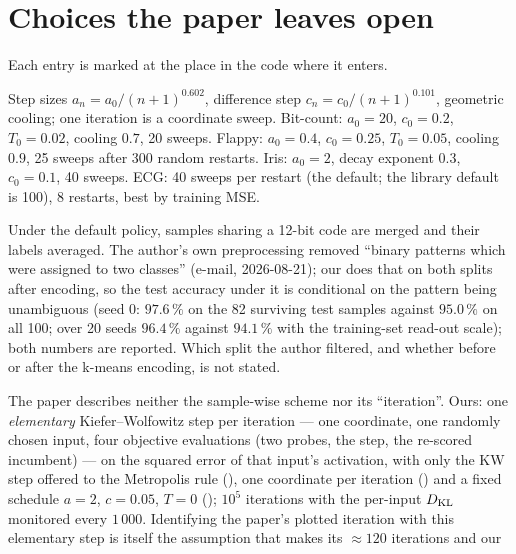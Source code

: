 \section{Choices the paper leaves open}
\label{app:assumptions}

Each entry is marked \code{[ASSUMPTION]} at the place in the code where it enters.

\begin{description}[leftmargin=1.2em,style=nextline,itemsep=2pt]
\item[Optimiser schedule (\cref{sec:kwsa}).]  Step sizes $a_n = a_0/(n+1)^{0.602}$,
difference step $c_n = c_0/(n+1)^{0.101}$, geometric cooling; one iteration is a coordinate
sweep.  Bit-count: $a_0 = 20$, $c_0 = 0.2$, $T_0 = 0.02$, cooling $0.7$, 20 sweeps.  Flappy:
$a_0 = 0.4$, $c_0 = 0.25$, $T_0 = 0.05$, cooling $0.9$, 25 sweeps after 300 random restarts.
Iris: $a_0 = 2$, decay exponent $0.3$, $c_0 = 0.1$, 40 sweeps.  ECG: 40 sweeps per restart (the
 default; the library default is 100), 8 restarts, best by training MSE.
\item[Iris ambiguous codes (\cref{sec:iris}).]  Under the default policy, samples sharing a
12-bit code are merged and their labels averaged.  The author's own preprocessing removed
``binary patterns which were assigned to two classes'' (e-mail, 2026-08-21); our
 does that on both splits after encoding, so the test accuracy under
it is conditional on the pattern being unambiguous (seed 0: $97.6\,\%$ on the 82 surviving test
samples against $95.0\,\%$ on all 100; over 20 seeds $96.4\,\%$ against $94.1\,\%$ with the
training-set read-out scale); both numbers are reported.  Which split the author
filtered, and whether before or after the k-means encoding, is not stated.
\item[Iterative baseline (\cref{sec:bitcount}).]  The paper describes neither the sample-wise
scheme nor its ``iteration''.  Ours: one \emph{elementary} Kiefer--Wolfowitz step per iteration
--- one coordinate, one randomly chosen input, four objective evaluations (two probes, the
step, the re-scored incumbent) --- on the squared error
of that input's activation, with only the KW step offered to the Metropolis rule
(), one coordinate per iteration () and a
fixed schedule $a = 2$, $c = 0.05$, $T = 0$ (); $10^5$ iterations with
the per-input $D_{\mathrm{KL}}$ monitored every $1\,000$.  Identifying the paper's plotted iteration with
this elementary step is itself the assumption that makes its $\approx 120$ iterations and our

\end{description}
